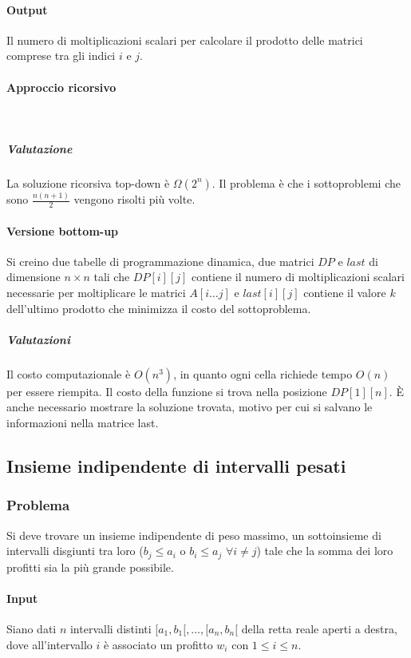 			\paragraph{Output}
			Il numero di moltiplicazioni scalari per calcolare il prodotto delle matrici comprese tra gli indici $i$ e $j$.
			\paragraph{Approccio ricorsivo}\mbox{}\\
			
			\subparagraph{Valutazione}
			La soluzione ricorsiva top-down \`e $\Omega(2^n)$. Il problema \`e che i sottoproblemi che sono $\frac{n(n+1)}{2}$ vengono risolti pi\`u volte.
			\paragraph{Versione bottom-up}
			Si creino due tabelle di programmazione dinamica, due matrici $DP$ e $last$ di dimensione $n\times n$ tali che $DP[i][j]$ contiene il numero di moltiplicazioni scalari necessarie per 
			moltiplicare le matrici $A[i\dots j]$ e $last[i][j]$ contiene il valore $k$ dell'ultimo prodotto che minimizza il costo del sottoproblema.\\
			
			\subparagraph{Valutazioni}
			Il costo computazionale \`e $O(n^3)$, in quanto ogni cella richiede tempo $O(n)$ per essere riempita. Il costo della funzione si trova nella posizione $DP[1][n]$. \`E anche necessario
			mostrare la soluzione trovata, motivo per cui si salvano le informazioni nella matrice last.\\ 
			

			
	\subsection{Insieme indipendente di intervalli pesati}
		\subsubsection{Problema}
			Si deve trovare un insieme indipendente di peso massimo, un sottoinsieme di intervalli disgiunti tra loro ($b_j \le a_i$ o $b_i\le a_j$ $\forall i\neq j$) tale che la somma dei loro 
			profitti sia la pi\`u grande possibile.
			\paragraph{Input}
			Siano dati $n$ intervalli distinti $[a_1, b_1[, \dots, [a_n, b_n[$ della retta reale aperti a destra, dove all'intervallo $i$ \`e associato un profitto $w_i$ con $1\le i\le n$.
